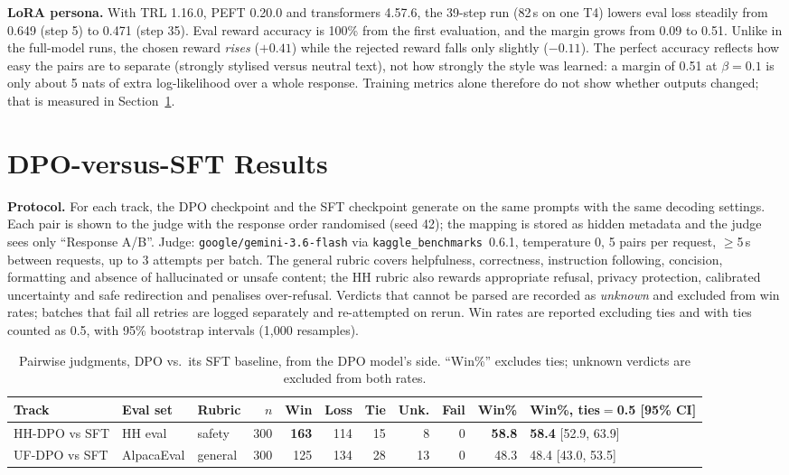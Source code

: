 \documentclass[10pt]{article}
\begin{document}
\textbf{LoRA persona.} With TRL 1.16.0, PEFT 0.20.0 and transformers 4.57.6, the 39-step run
(82\,s on one T4) lowers eval loss steadily from 0.649 (step 5) to 0.471 (step 35). Eval reward
accuracy is 100\% from the first evaluation, and the margin grows from 0.09 to 0.51. Unlike in the
full-model runs, the chosen reward \emph{rises} ($+0.41$) while the rejected reward falls only
slightly ($-0.11$). The perfect accuracy reflects how easy the pairs are to separate (strongly
stylised versus neutral text), not how strongly the style was learned: a margin of 0.51 at
$\beta=0.1$ is only about 5 nats of extra log-likelihood over a whole response. Training metrics
alone therefore do not show whether outputs changed; that is measured in Section~\ref{sec:results}.

\section{DPO-versus-SFT Results}\label{sec:results}
\textbf{Protocol.} For each track, the DPO checkpoint and the SFT checkpoint generate on the same
prompts with the same decoding settings. Each pair is shown to the judge with the response order
randomised (seed 42); the mapping is stored as hidden metadata and the judge sees only
``Response A/B''. Judge: \texttt{google/gemini-3.6-flash} via \texttt{kaggle\_benchmarks}~0.6.1,
temperature 0, 5 pairs per request, $\ge$5\,s between requests, up to 3 attempts per batch. The
general rubric covers helpfulness, correctness, instruction following, concision, formatting and
absence of hallucinated or unsafe content; the HH rubric also rewards appropriate refusal, privacy
protection, calibrated uncertainty and safe redirection and penalises over-refusal. Verdicts that
cannot be parsed are recorded as \emph{unknown} and excluded from win rates; batches that fail all
retries are logged separately and re-attempted on rerun. Win rates are reported excluding ties and
with ties counted as 0.5, with 95\% bootstrap intervals (1{,}000 resamples).

\begin{table}[h]
\centering\footnotesize
\caption{Pairwise judgments, DPO vs.\ its SFT baseline, from the DPO model's side. ``Win\%'' excludes ties; unknown verdicts are excluded from both rates.}
\label{tab:results}
\setlength{\tabcolsep}{4pt}
\begin{tabular}{@{}lllrrrrrrrl@{}}
\toprule
Track & Eval set & Rubric & $n$ & Win & Loss & Tie & Unk. & Fail & Win\% & Win\%, ties$=$0.5 [95\% CI] \\
\midrule
HH-DPO vs SFT & HH eval & safety  & 300 & \textbf{163} & 114 & 15 & 8 & 0 & \textbf{58.8} & \textbf{58.4} [52.9, 63.9] \\
UF-DPO vs SFT & AlpacaEval & general & 300 & 125 & 134 & 28 & 13 & 0 & 48.3 & 48.4 [43.0, 53.5] \\
\bottomrule
\end{tabular}
\end{table}
\end{document}
